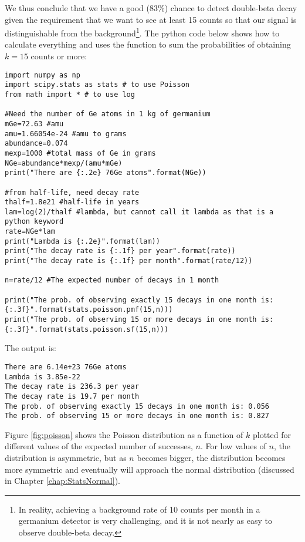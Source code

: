 \begin{example}{}
We thus conclude that we have a good (83\%) chance to detect double-beta decay given the requirement that we want to see at least 15 counts so that our signal is distinguishable from the background\footnote{In reality, achieving a background rate of 10 counts per month in a germanium detector is very challenging, and it is not nearly as easy to observe double-beta decay.}. The python code below shows how to calculate everything and uses the function  to sum the probabilities of obtaining $k=15$ counts or more:
\begin{lstlisting}[frame=single] 
import numpy as np
import scipy.stats as stats # to use Poisson
from math import * # to use log

#Need the number of Ge atoms in 1 kg of germanium
mGe=72.63 #amu
amu=1.66054e-24 #amu to grams
abundance=0.074
mexp=1000 #total mass of Ge in grams
NGe=abundance*mexp/(amu*mGe)
print("There are {:.2e} 76Ge atoms".format(NGe))

#from half-life, need decay rate
thalf=1.8e21 #half-life in years
lam=log(2)/thalf #lambda, but cannot call it lambda as that is a python keyword
rate=NGe*lam
print("Lambda is {:.2e}".format(lam))
print("The decay rate is {:.1f} per year".format(rate))
print("The decay rate is {:.1f} per month".format(rate/12))

n=rate/12 #The expected number of decays in 1 month

print("The prob. of observing exactly 15 decays in one month is: {:.3f}".format(stats.poisson.pmf(15,n)))
print("The prob. of observing 15 or more decays in one month is: {:.3f}".format(stats.poisson.sf(15,n)))
\end{lstlisting}
The output is:
\begin{verbatim}
There are 6.14e+23 76Ge atoms
Lambda is 3.85e-22
The decay rate is 236.3 per year
The decay rate is 19.7 per month
The prob. of observing exactly 15 decays in one month is: 0.056
The prob. of observing 15 or more decays in one month is: 0.827
\end{verbatim}

\end{example}

Figure \ref{fig:poisson} shows the Poisson distribution as a function of $k$ plotted for different values of the expected number of successes, $n$. For low values of $n$, the distribution is asymmetric, but as $n$ becomes bigger, the distribution becomes more symmetric and eventually will approach the normal distribution (discussed in Chapter \ref{chap:StatsNormal}).

